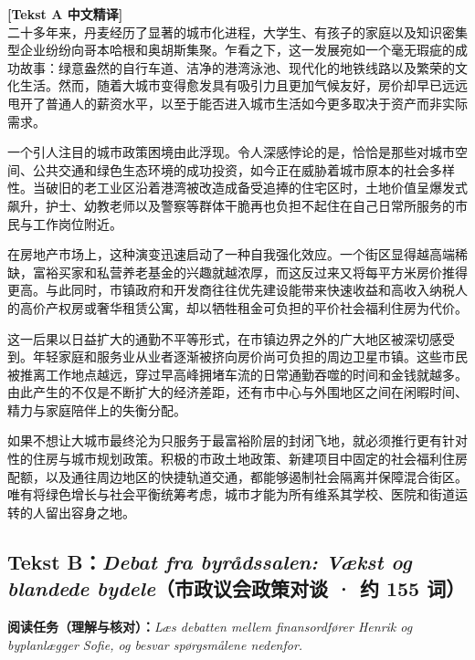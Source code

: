 \begin{transbox}
\small
\textbf{\color{NCDTeal}[Tekst A 中文精译]}\\
二十多年来，丹麦经历了显著的城市化进程，大学生、有孩子的家庭以及知识密集型企业纷纷向哥本哈根和奥胡斯集聚。乍看之下，这一发展宛如一个毫无瑕疵的成功故事：绿意盎然的自行车道、洁净的港湾泳池、现代化的地铁线路以及繁荣的文化生活。然而，随着大城市变得愈发具有吸引力且更加气候友好，房价却早已远远甩开了普通人的薪资水平，以至于能否进入城市生活如今更多取决于资产而非实际需求。

一个引人注目的城市政策困境由此浮现。令人深感悖论的是，恰恰是那些对城市空间、公共交通和绿色生态环境的成功投资，如今正在威胁着城市原本的社会多样性。当破旧的老工业区沿着港湾被改造成备受追捧的住宅区时，土地价值呈爆发式飙升，护士、幼教老师以及警察等群体干脆再也负担不起住在自己日常所服务的市民与工作岗位附近。

在房地产市场上，这种演变迅速启动了一种自我强化效应。一个街区显得越高端稀缺，富裕买家和私营养老基金的兴趣就越浓厚，而这反过来又将每平方米房价推得更高。与此同时，市镇政府和开发商往往优先建设能带来快速收益和高收入纳税人的高价产权房或奢华租赁公寓，却以牺牲租金可负担的平价社会福利住房为代价。

这一后果以日益扩大的通勤不平等形式，在市镇边界之外的广大地区被深切感受到。年轻家庭和服务业从业者逐渐被挤向房价尚可负担的周边卫星市镇。这些市民被推离工作地点越远，穿过早高峰拥堵车流的日常通勤吞噬的时间和金钱就越多。由此产生的不仅是不断扩大的经济差距，还有市中心与外围地区之间在闲暇时间、精力与家庭陪伴上的失衡分配。

如果不想让大城市最终沦为只服务于最富裕阶层的封闭飞地，就必须推行更有针对性的住房与城市规划政策。积极的市政土地政策、新建项目中固定的社会福利住房配额，以及通往周边地区的快捷轨道交通，都能够遏制社会隔离并保障混合街区。唯有将绿色增长与社会平衡统筹考虑，城市才能为所有维系其学校、医院和街道运转的人留出容身之地。
\end{transbox}

\subsection*{Tekst B：\textit{Debat fra byrådssalen: Vækst og blandede bydele}（市政议会政策对谈 · 约 155 词）}

\textbf{阅读任务（理解与核对）：}\textit{Læs debatten mellem finansordfører Henrik og byplanlægger Sofie, og besvar spørgsmålene nedenfor.}

